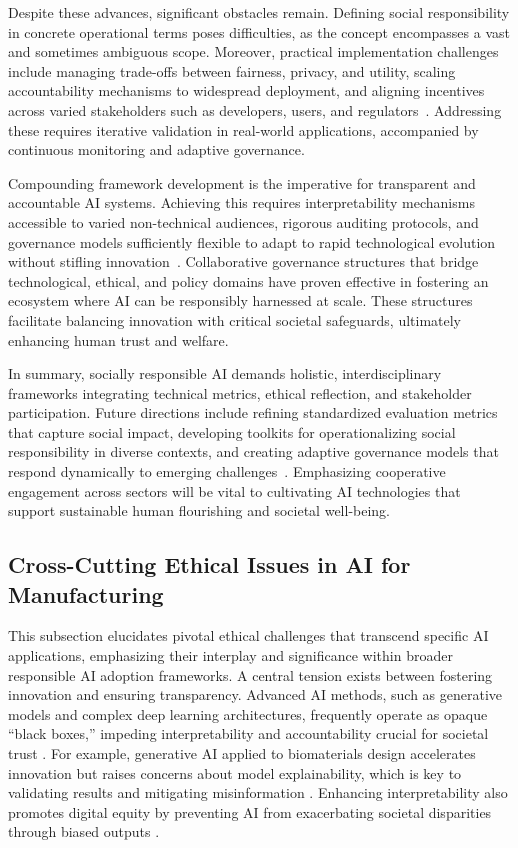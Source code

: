 \documentclass[sigconf]{acmart}
\begin{document}
Despite these advances, significant obstacles remain. Defining social responsibility in concrete operational terms poses difficulties, as the concept encompasses a vast and sometimes ambiguous scope. Moreover, practical implementation challenges include managing trade-offs between fairness, privacy, and utility, scaling accountability mechanisms to widespread deployment, and aligning incentives across varied stakeholders such as developers, users, and regulators~\cite{ref26}. Addressing these requires iterative validation in real-world applications, accompanied by continuous monitoring and adaptive governance.

Compounding framework development is the imperative for transparent and accountable AI systems. Achieving this requires interpretability mechanisms accessible to varied non-technical audiences, rigorous auditing protocols, and governance models sufficiently flexible to adapt to rapid technological evolution without stifling innovation~\cite{ref26}. Collaborative governance structures that bridge technological, ethical, and policy domains have proven effective in fostering an ecosystem where AI can be responsibly harnessed at scale. These structures facilitate balancing innovation with critical societal safeguards, ultimately enhancing human trust and welfare.

In summary, socially responsible AI demands holistic, interdisciplinary frameworks integrating technical metrics, ethical reflection, and stakeholder participation. Future directions include refining standardized evaluation metrics that capture social impact, developing toolkits for operationalizing social responsibility in diverse contexts, and creating adaptive governance models that respond dynamically to emerging challenges~\cite{ref26}. Emphasizing cooperative engagement across sectors will be vital to cultivating AI technologies that support sustainable human flourishing and societal well-being.

\subsection{Cross-Cutting Ethical Issues in AI for Manufacturing}

This subsection elucidates pivotal ethical challenges that transcend specific AI applications, emphasizing their interplay and significance within broader responsible AI adoption frameworks. A central tension exists between fostering innovation and ensuring transparency. Advanced AI methods, such as generative models and complex deep learning architectures, frequently operate as opaque “black boxes,” impeding interpretability and accountability crucial for societal trust \cite{ref7,ref8}. For example, generative AI applied to biomaterials design accelerates innovation but raises concerns about model explainability, which is key to validating results and mitigating misinformation \cite{ref7}. Enhancing interpretability also promotes digital equity by preventing AI from exacerbating societal disparities through biased outputs \cite{ref6,ref17}.
\end{document}
